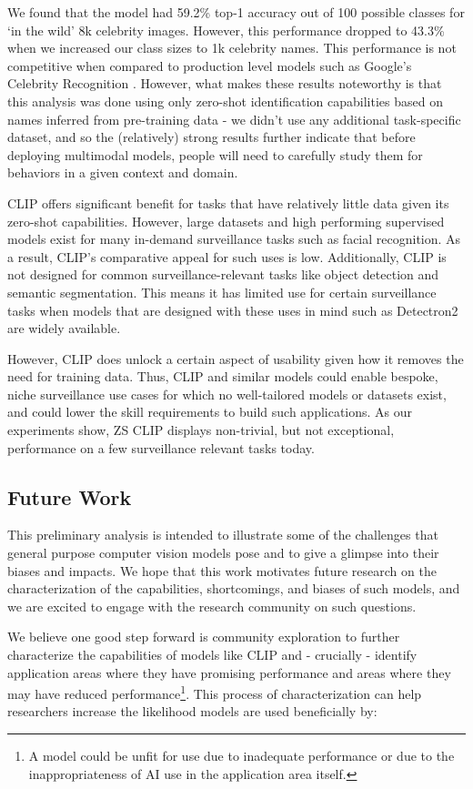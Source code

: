 We found that the model had 59.2\% top-1 accuracy out of 100 possible classes for `in the wild' 8k celebrity images. However, this performance dropped to 43.3\% when we increased our class sizes to 1k celebrity names. This performance is not competitive when compared to production level models such as Google's Celebrity Recognition \citep{Google}. However, what makes these results noteworthy is that this analysis was done using only zero-shot identification capabilities based on names inferred from pre-training data - we didn’t use any additional task-specific dataset, and so the (relatively) strong results further indicate that before deploying multimodal models, people will need to carefully study them for behaviors in a given context and domain.

CLIP offers significant benefit for tasks that have relatively little data given its zero-shot capabilities. However, large datasets and high performing supervised models exist for many in-demand surveillance tasks such as facial recognition. As a result, CLIP’s comparative appeal for such uses is low. Additionally, CLIP is not designed for common surveillance-relevant tasks like object detection and semantic segmentation. This means it has limited use for certain surveillance tasks when models that are designed with these uses in mind such as Detectron2 \citep{wu2019detectron2} are widely available.

However, CLIP does unlock a certain aspect of usability given how it removes the need for training data. Thus, CLIP and similar models could enable bespoke, niche surveillance use cases for which no well-tailored models or datasets exist, and could lower the skill requirements to build such applications. As our experiments show, ZS CLIP displays non-trivial, but not exceptional, performance on a few surveillance relevant tasks today. 

\subsection{Future Work} This preliminary analysis is intended to illustrate some of the challenges that general purpose computer vision models pose and to give a glimpse into their biases and impacts. We hope that this work motivates future research on the characterization of the capabilities, shortcomings, and biases of such models, and we are excited to engage with the research community on such questions. 

We believe one good step forward is community exploration to further characterize the capabilities of models like CLIP and - crucially - identify application areas where they have promising performance and areas where they may have reduced performance\footnote{A model could be unfit for use due to inadequate performance or due to the inappropriateness of AI use in the application area itself.}. This process of characterization can help researchers increase the likelihood models are used beneficially by:


